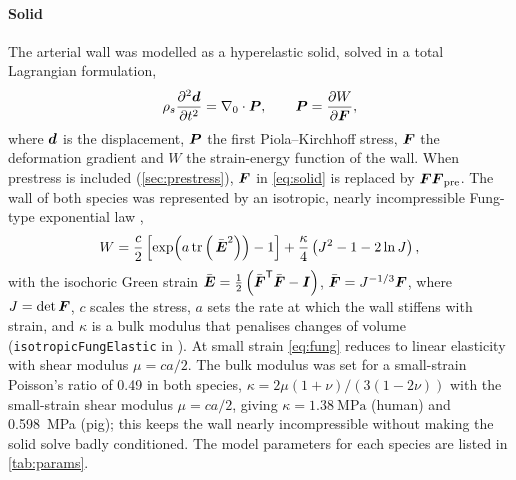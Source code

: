 \paragraph{Solid}
The arterial wall was modelled as a hyperelastic solid, solved in a total Lagrangian formulation,
\begin{equation}
  \rho_s \frac{\partial^2 \boldsymbol{d}}{\partial t^2} = \nabla_0 \cdot \boldsymbol{P},
  \qquad
  \boldsymbol{P} = \frac{\partial W}{\partial \boldsymbol{F}},
  \label{eq:solid}
\end{equation}
where $\boldsymbol{d}$ is the displacement, $\boldsymbol{P}$ the first Piola--Kirchhoff stress, $\boldsymbol{F}$ the deformation gradient and $W$ the strain-energy function of the wall.
When prestress is included (\cref{sec:prestress}), $\boldsymbol{F}$ in \cref{eq:solid} is replaced by $\boldsymbol{F}\boldsymbol{F}_{\mathrm{pre}}$.
The wall of both species was represented by an isotropic, nearly incompressible Fung-type exponential law \citep{fung1993biomechanics},
\begin{equation}
  W = \frac{c}{2}\left[\exp\!\left(a\,\mathrm{tr}\left(\,\bar{\boldsymbol{E}}^{2}\right)\right) - 1\right]
    + \frac{\kappa}{4}\left(J^{2} - 1 - 2\ln J\right),
  \label{eq:fung}
\end{equation}
with the isochoric Green strain $\bar{\boldsymbol{E}} = \tfrac12\left(\bar{\boldsymbol{F}}^{\mathsf{T}}\bar{\boldsymbol{F}} - \boldsymbol{I}\right)$, $\bar{\boldsymbol{F}} = J^{-1/3}\boldsymbol{F}$, where $J = \det\boldsymbol{F}$, $c$ scales the stress, $a$ sets the rate at which the wall stiffens with strain, and $\kappa$ is a bulk modulus that penalises changes of volume (\texttt{isotropicFungElastic} in \solidsFoam).
At small strain \cref{eq:fung} reduces to linear elasticity with shear modulus $\mu = ca/2$.
The bulk modulus was set for a small-strain Poisson's ratio of 0.49 in both species, $\kappa = 2\mu(1+\nu)/\left(3(1-2\nu)\right)$ with the small-strain shear modulus $\mu = ca/2$, giving $\kappa = \SI{1.38}{\mega\pascal}$ (human) and \SI{0.598}{\mega\pascal} (pig); this keeps the wall nearly incompressible without making the solid solve badly conditioned.
The model parameters for each species are listed in \cref{tab:params}.


